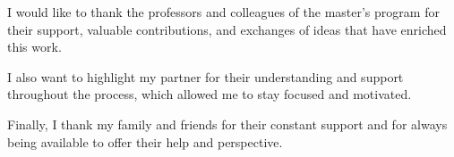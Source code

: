 \cleardoublepage
{}
\vspace{15ex}

I would like to thank the professors and colleagues of the master's program for their support, valuable contributions, and exchanges of ideas that have enriched this work.

\medskip
I also want to highlight my partner for their understanding and support throughout the process, which allowed me to stay focused and motivated.

\medskip
Finally, I thank my family and friends for their constant support and for always being available to offer their help and perspective.